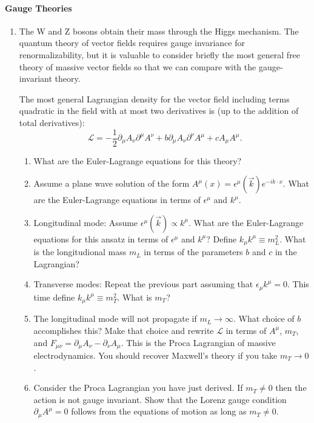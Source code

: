 \documentclass[letterpaper,11pt]{article}
\begin{document}
\paragraph*{Gauge Theories}
\begin{enumerate}
  \item The W and Z bosons obtain their mass through the Higgs mechanism. The quantum theory of vector fields requires gauge invariance for renormalizability, but it is valuable to consider briefly the most general free theory of massive vector fields so that we can compare with the gauge-invariant theory.

  The most general Lagrangian density for the vector field including terms quadratic in the field with at most two derivatives is (up to the addition of total derivatives):
  \begin{equation*}
    \mathcal{L} = -\frac{1}{2} \partial_\mu A_\nu \partial^\mu A^\nu + b \partial_\mu A_\nu \partial^\nu A^\mu + c A_\mu A^\mu.
  \end{equation*}
  \begin{enumerate}
    \item What are the Euler-Lagrange equations for this theory?
    \item Assume a plane wave solution of the form $A^\mu(x) = \epsilon^\mu(\vec{k})e^{-i k \cdot x}$. What are the Euler-Lagrange equations in terms of $\epsilon^\mu$ and $k^\mu$.
    \item Longitudinal mode: Assume $\epsilon^\mu(\vec{k}) \propto k^\mu$. What are the Euler-Lagrange equations for this ansatz in terms of $\epsilon^\mu$ and $k^\mu$? Define $k_\mu k^\mu \equiv m_L^2$. What is the longitudional mass $m_L$ in terms of the parameters $b$ and $c$ in the Lagrangian?
    \item Transverse modes: Repeat the previous part assuming that $\epsilon_\mu k^\mu = 0$. This time define $k_\mu k^\mu \equiv m_T^2$. What is $m_T$?
    \item The longitudinal mode will not propagate if $m_L \to \infty$. What choice of $b$ accomplishes this? Make that choice and rewrite $\mathcal{L}$ in terms of $A^\mu$, $m_T$, and $F_{\mu\nu} = \partial_\mu A_\nu - \partial_\nu A_\mu$. This is the Proca Lagrangian of massive electrodynamics. You should recover Maxwell's theory if you take $m_T \to 0$.
    \item Consider the Proca Lagrangian you have just derived. If $m_T \ne 0$ then the action is not gauge invariant. Show that the Lorenz gauge condition $\partial_\mu A^\mu = 0$ follows from the equations of motion as long as $m_T \ne 0$.
  \end{enumerate}
\end{enumerate}
\end{document}
